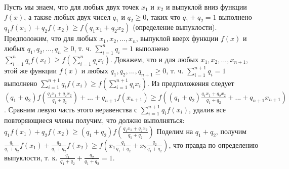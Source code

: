 Пусть мы знаем, что для любых двух точек $x_1$ и $x_2$ и выпуклой вниз функции $f(x)$, а также любых двух чисел $q_1$ и $q_2 \geq 0$, таких что $q_1+q_2=1$ выполнено $q_1f(x_1)+q_2f(x_2) \geq f(q_1x_1+ q_2x_2)$ (определение выпуклости). Предположим, что для любых $x_1, x_2, ..., x_n$, выпуклой вверх функции $f(x)$ и любых $q_1, q_2, ..., q_n \geq 0$, т. ч. $\sum_{i=1}^n q_i = 1$ выполнено $\sum_{i=1}^n q_if(x_i) \geq f(\sum_{i=1}^n q_ix_i)$. Докажем, что и для любых $x_1, x_2, ..., x_{n+1}$, этой же функции $f(x)$ и любых $q_1, q_2, ..., q_{n+1} \geq 0$, т. ч. $\sum_{i=1}^{n+1} q_i = 1$ выполнено $\sum_{i=1}^{n+1} q_if(x_i) \geq f(\sum_{i=1}^{n+1} q_ix_i)$. Из предположения следует $(q_1+q_2)f(\frac{q_1x_1 + q_2x_2}{q_1+q_2}) + ... + q_{n+1}f(x_{n+1}) \geq f((q_1+q_2)\frac{q_1x_1 + q_2x_2}{q_1+q_2} + ...  + q_{n+1}x_{n+1})$. Сравним левую часть этого неравенства с $\sum_{i=1}^{n+1} q_if(x_i)$, удалив все повторяющиеся члены получим, что должно выполняться: $q_1f(x_1)+q_2f(x_2) \geq (q_1+q_2)f(\frac{q_1x_1 + q_2x_2}{q_1+q_2})$ Поделим на $q_1+q_2$, получим $\frac{q_1}{q_1+q_2}f(x_1)+\frac{q_2}{q_1+q_2}f(x_2) \geq f(x_1\frac{q_1}{q_1+q_2} + x_2\frac{q_2}{q_1+q_2})$, что правда по определению выпуклости, т. к. $\frac{q_1}{q_1+q_2} + \frac{q_2}{q_1+q_2} = 1$.
